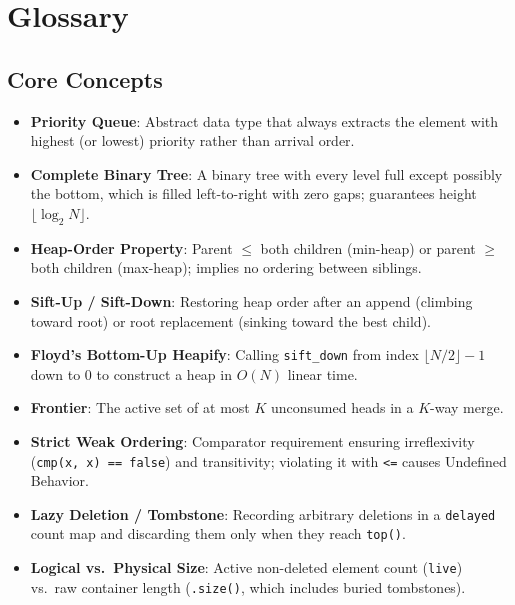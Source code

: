 \documentclass[11pt,a4paper]{article}
\theoremstyle{definition}
\begin{document}
\section{Glossary}

\subsection*{Core Concepts}
\begin{itemize}[itemsep=2pt]
    \item \textbf{Priority Queue}: Abstract data type that always extracts the element with highest (or lowest) priority rather than arrival order.
    \item \textbf{Complete Binary Tree}: A binary tree with every level full except possibly the bottom, which is filled left-to-right with zero gaps; guarantees height $\lfloor \log_2 N \rfloor$.
    \item \textbf{Heap-Order Property}: Parent $\le$ both children (min-heap) or parent $\ge$ both children (max-heap); implies no ordering between siblings.
    \item \textbf{Sift-Up / Sift-Down}: Restoring heap order after an append (climbing toward root) or root replacement (sinking toward the best child).
    \item \textbf{Floyd's Bottom-Up Heapify}: Calling \texttt{sift\_down} from index $\lfloor N/2 \rfloor - 1$ down to $0$ to construct a heap in $O(N)$ linear time.
    \item \textbf{Frontier}: The active set of at most $K$ unconsumed heads in a $K$-way merge.
    \item \textbf{Strict Weak Ordering}: Comparator requirement ensuring irreflexivity (\texttt{cmp(x, x) == false}) and transitivity; violating it with \texttt{<=} causes Undefined Behavior.
    \item \textbf{Lazy Deletion / Tombstone}: Recording arbitrary deletions in a \texttt{delayed} count map and discarding them only when they reach \texttt{top()}.
    \item \textbf{Logical vs.\ Physical Size}: Active non-deleted element count (\texttt{live}) vs.\ raw container length (\texttt{.size()}, which includes buried tombstones).
\end{itemize}
\end{document}
